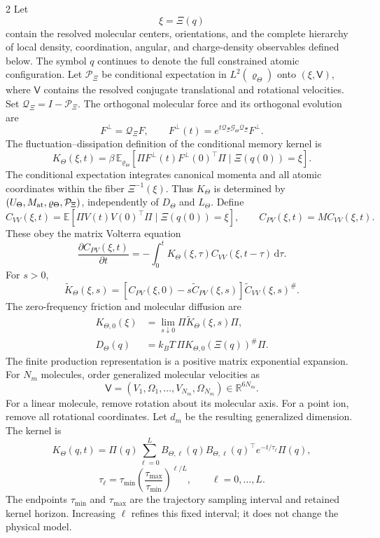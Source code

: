 \documentclass[10pt]{article}
\newcommand{\dd}{\,\mathrm d}
\newcommand{\pinv}{^{\#}}
\begin{document}
\begin{multicols}{2}
Let
\[
\xi=\Xi(q)
\]
contain the resolved molecular centers, orientations, and the complete hierarchy of
local density, coordination, angular, and charge-density observables defined below.
The symbol \(q\) continues to denote the full constrained atomic configuration.
Let \(\mathcal P_\Xi\) be conditional expectation in
\(L^2(\varrho_\Theta)\) onto \((\xi,\mathsf V)\), where \(\mathsf V\) contains the
resolved conjugate translational and rotational velocities. Set
\(\mathcal Q_\Xi=I-\mathcal P_\Xi\). The orthogonal molecular force and its orthogonal
evolution are
\[
F^\perp=\mathcal Q_\Xi F,\qquad
F^\perp(t)=
e^{t\mathcal Q_\Xi\mathcal G_\Theta\mathcal Q_\Xi}F^\perp.
\]
The fluctuation--dissipation definition of the conditional memory kernel is
\[
\boxed{
K_\Theta(\xi,t)=\beta\,
\mathbb E_{\varrho_\Theta}\!\left[
\Pi F^\perp(t)F^\perp(0)^\top\Pi\mid \Xi(q(0))=\xi
\right].}
\]
The conditional expectation integrates canonical momenta and all atomic coordinates
within the fiber \(\Xi^{-1}(\xi)\). Thus \(K_\Theta\) is determined by
\((U_\Theta,M_{\rm at},\varrho_\Theta,\mathcal P_\Xi)\), independently of
\(D_\Theta\) and \(L_\Theta\).
Define
\[
C_{VV}(\xi,t)=
\mathbb E[\Pi V(t)V(0)^\top\Pi\mid \Xi(q(0))=\xi],
\qquad C_{PV}(\xi,t)=MC_{VV}(\xi,t).
\]
These obey the matrix Volterra equation
\[
\frac{\partial C_{PV}(\xi,t)}{\partial t}
=-\int_0^tK_\Theta(\xi,\tau)C_{VV}(\xi,t-\tau)\dd\tau.
\]
For \(s>0\),
\[
\boxed{
\widetilde K_\Theta(\xi,s)=
\left[C_{PV}(\xi,0)-s\widetilde C_{PV}(\xi,s)\right]
\widetilde C_{VV}(\xi,s)\pinv.}
\]
The zero-frequency friction and molecular diffusion are
\[
\boxed{\begin{aligned}
K_{\Theta,0}(\xi)&=\lim_{s\downarrow0}
\Pi\widetilde K_\Theta(\xi,s)\Pi,\\
D_\Theta(q)&=k_BT\,\Pi K_{\Theta,0}(\Xi(q))\pinv\Pi.
\end{aligned}}
\]
The finite production representation is a positive matrix exponential expansion.
For \(N_m\) molecules, order generalized molecular velocities as
\[
\mathsf V=(V_1,\Omega_1,\ldots,V_{N_m},\Omega_{N_m})\in\mathbb R^{6N_m}.
\]
For a linear molecule, remove rotation about its molecular axis.  For a point ion,
remove all rotational coordinates.  Let \(d_m\) be the resulting generalized
dimension.  The kernel is
\[
\boxed{
K_\Theta(q,t)=
\Pi(q)\sum_{\ell=0}^{L}
B_{\Theta,\ell}(q)B_{\Theta,\ell}(q)^\top
e^{-t/\tau_\ell}\Pi(q),}
\]
\[
\tau_\ell=\tau_{\min}
\left(\frac{\tau_{\max}}{\tau_{\min}}\right)^{\ell/L},
\qquad \ell=0,\ldots,L.
\]
The endpoints \(\tau_{\min}\) and \(\tau_{\max}\) are the trajectory sampling
interval and retained kernel horizon.  Increasing \(\ell\) refines this fixed
interval; it does not change the physical model.


\end{multicols}
\end{document}
